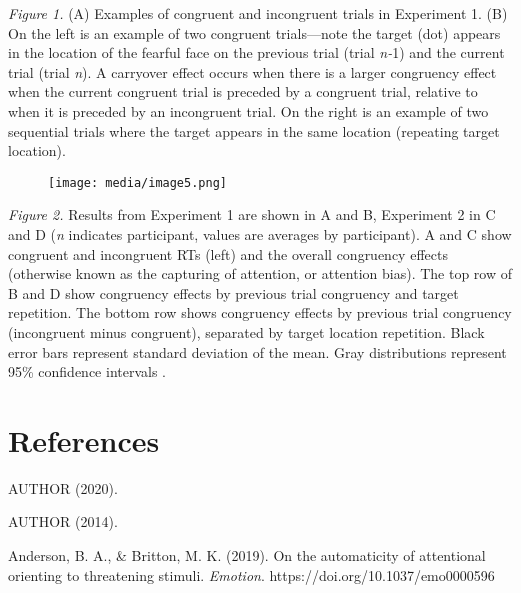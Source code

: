 \documentclass{article}
\begin{document}
	\emph{Figure 1. }(A) Examples of congruent and incongruent trials in Experiment 1. (B) On the left is an{\color{4472C4} example of }two congruent trials—note the target (dot) appears in the location of the fearful face on the previous trial (trial \emph{n-}1) and the current trial (trial \emph{n}). A carryover effect occurs when there is a larger congruency effect when the current congruent trial is preceded by a congruent trial, relative to when it is preceded by an incongruent trial. On the right is an example of two sequential trials where the target appears in the same location (repeating target location).



	\begin{figure}
		\texttt{[image: media/image5.png]}

		\caption{}

		\label{fig:rId15}


	\end{figure}



	\emph{Figure 2. }Results from Experiment 1 are shown in A and B, Experiment 2 in C and D {\color{4472C4}(}{\color{4472C4}\emph{n}}{\color{4472C4} indicates participant, values are averages by participant)}. A and C show congruent and incongruent RTs (left) and the overall congruency effects (otherwise known as the capturing of attention, or attention bias). The top row of B and D show congruency effects by previous trial congruency and target repetition. The bottom row shows congruency effects by previous trial congruency (incongruent minus congruent), separated by target location repetition. Black error bars represent standard deviation of the mean. Gray distributions represent 95\% confidence intervals \textcite{[object Object]}.







	\section{References}



	AUTHOR (2020).



	AUTHOR (2014).



	Anderson, B. A., \& Britton, M. K. (2019). On the automaticity of attentional orienting to threatening stimuli. \emph{Emotion}. https://doi.org/10.1037/emo0000596
\end{document}
